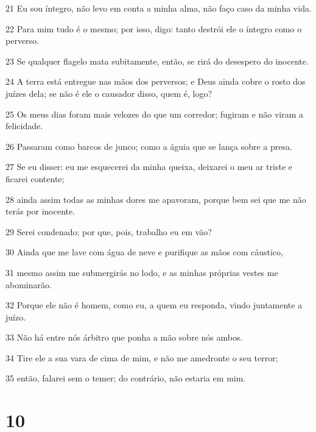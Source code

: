\par 21 Eu sou íntegro, não levo em conta a minha alma, não faço caso da minha vida.
\par 22 Para mim tudo é o mesmo; por isso, digo: tanto destrói ele o íntegro como o perverso.
\par 23 Se qualquer flagelo mata subitamente, então, se rirá do desespero do inocente.
\par 24 A terra está entregue nas mãos dos perversos; e Deus ainda cobre o rosto dos juízes dela; se não é ele o causador disso, quem é, logo?
\par 25 Os meus dias foram mais velozes do que um corredor; fugiram e não viram a felicidade.
\par 26 Passaram como barcos de junco; como a águia que se lança sobre a presa.
\par 27 Se eu disser: eu me esquecerei da minha queixa, deixarei o meu ar triste e ficarei contente;
\par 28 ainda assim todas as minhas dores me apavoram, porque bem sei que me não terás por inocente.
\par 29 Serei condenado; por que, pois, trabalho eu em vão?
\par 30 Ainda que me lave com água de neve e purifique as mãos com cáustico,
\par 31 mesmo assim me submergirás no lodo, e as minhas próprias vestes me abominarão.
\par 32 Porque ele não é homem, como eu, a quem eu responda, vindo juntamente a juízo.
\par 33 Não há entre nós árbitro que ponha a mão sobre nós ambos.
\par 34 Tire ele a sua vara de cima de mim, e não me amedronte o seu terror;
\par 35 então, falarei sem o temer; do contrário, não estaria em mim.

\chapter{10}

